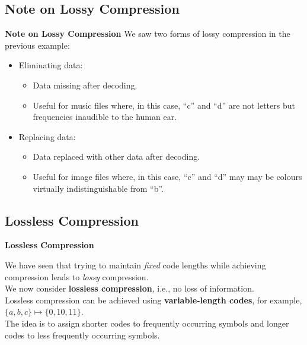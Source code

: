 \documentclass[compress]{beamer}        %
\makeatletter
\newcommand{\tcb}{\textcolor{beamer@blendedblue}}
\makeatother
\begin{document}
\subsection{Note on Lossy Compression}
\begin{frame}{\bf \tcb{Note on Lossy Compression}}
We saw two forms of lossy compression in the previous example:\\[0.4cm]
\begin{itemize}\itemsep0.7cm
\item Eliminating data:\\[0.1cm]
\begin{itemize}\itemsep0.4cm
\item Data missing after decoding.
\item Useful for music files where, in this case, ``c'' and ``d'' are not letters but frequencies inaudible to the human ear.
\end{itemize}
\item Replacing data:\\[0.1cm]
\begin{itemize}\itemsep0.4cm
\item Data replaced with other data after decoding.
\item Useful for image files where, in this case, ``c'' and ``d'' may may be colours virtually indistinguishable from ``b''.
\end{itemize}
\end{itemize}

\end{frame}




\subsection{Lossless Compression}
\begin{frame}{\bf \tcb{Lossless Compression}}

We have seen that trying to maintain \emph{fixed} code lengths while achieving compression leads to \emph{lossy} compression.\\[0.8cm]

We now consider {\bf lossless compression}, i.e., no loss of information.\\[0.8cm]

Lossless compression can be achieved using {\bf variable-length codes}, for example, $\{a,b,c\} \mapsto \{0,10,11\}$.\\[0.8cm]

The idea is to assign shorter codes to frequently occurring symbols and longer codes to less frequently occurring symbols.
\end{frame}
\end{document}
